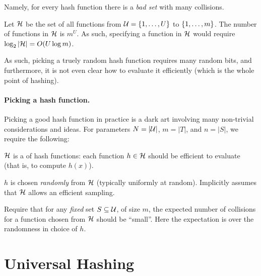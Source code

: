 Namely, for every hash function there is a \emph{bad set} with many
collisions.

\begin{observation}
    Let $\mathcal{H}$ be the set of all functions from
    $\mathcal{U} = \left\{ {1,\ldots, U} \right\}$ to $\left\{ {1, \ldots, m} \right\}$. The number of
    functions in $\mathcal{H}$ is $m^U$. As such, specifying a function in
    $\mathcal{H}$ would require $\log_2 \left| {\mathcal{H}} \right| = O(U \log m)$.
\end{observation}

As such, picking a truely random hash function requires many random
bits, and furthermore, it is not even clear how to evaluate it
efficiently (which is the whole point of hashing).



\paragraph*{Picking a hash function.}
Picking a good hash function in practice is a dark art involving many
non-trivial considerations and ideas. For parameters $N = |\mathcal{U}|$,
$m = |T|$, and $n = |S|$, we require the following:
\begin{compactenumA}
    \item $\mathcal{H}$ is a  of hash functions: each function
    $h \in \mathcal{H}$ should be efficient to evaluate (that is, to compute
    $h(x)$).
    
    \item $h$ is chosen \emph{randomly} from $\mathcal{H}$ (typically
    uniformly at random). Implicitly assumes that $\mathcal{H}$ allows an
    efficient sampling.
    
    \item Require that for any {\em fixed} set $S \subseteq \mathcal{U}$, of
    size $m$, the expected number of collisions for a function chosen
    from $\mathcal{H}$ should be ``small''. Here the expectation is over the
    randomness in choice of $h$.
\end{compactenumA}




\section{Universal Hashing}

